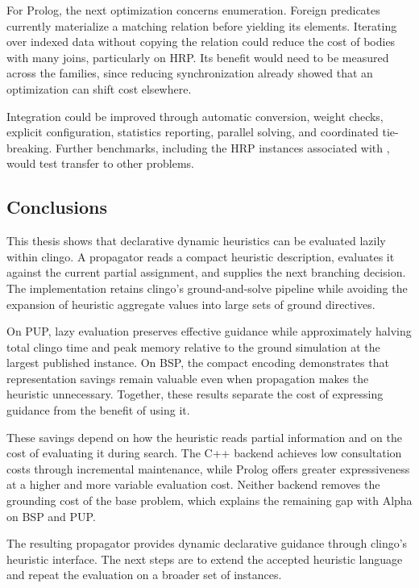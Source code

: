 For Prolog, the next optimization concerns enumeration. Foreign predicates currently materialize a matching relation before yielding its elements. Iterating over indexed data without copying the relation could reduce the cost of bodies with many joins, particularly on HRP. Its benefit would need to be measured across the families, since reducing synchronization already showed that an optimization can shift cost elsewhere.

\begin{samepage}
Integration could be improved through automatic conversion, weight checks, explicit configuration, statistics reporting, parallel solving, and coordinated tie-breaking. Further benchmarks, including the HRP instances associated with \cite{semmelrock2026evolvingcode}, would test transfer to other problems.
\end{samepage}

\clearpage
\begin{samepage}
\section{Conclusions}

This thesis shows that declarative dynamic heuristics can be evaluated lazily within clingo. A propagator reads a compact heuristic description, evaluates it against the current partial assignment, and supplies the next branching decision. The implementation retains clingo's ground-and-solve pipeline while avoiding the expansion of heuristic aggregate values into large sets of ground directives.

On PUP, lazy evaluation preserves effective guidance while approximately halving total clingo time and peak memory relative to the ground simulation at the largest published instance. On BSP, the compact encoding demonstrates that representation savings remain valuable even when propagation makes the heuristic unnecessary. Together, these results separate the cost of expressing guidance from the benefit of using it.

These savings depend on how the heuristic reads partial information and on the cost of evaluating it during search. The C++ backend achieves low consultation costs through incremental maintenance, while Prolog offers greater expressiveness at a higher and more variable evaluation cost. Neither backend removes the grounding cost of the base problem, which explains the remaining gap with Alpha on BSP and PUP.

The resulting propagator provides dynamic declarative guidance through clingo's heuristic interface. The next steps are to extend the accepted heuristic language and repeat the evaluation on a broader set of instances.

\end{samepage}
\endgroup